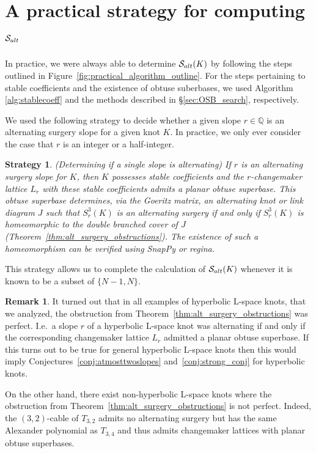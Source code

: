 \documentclass{amsart} %
\newcommand{\Q}{\mathbb{Q}}
\newcommand{\Salt}{\mathcal{S}_{\rm alt}}
\theoremstyle{thm}
\newtheorem{strat}[Theorem]{Strategy}
\theoremstyle{definition}
\newtheorem{rem}[Theorem]{Remark}
\numberwithin{equation}{section}
\begin{document}
\section{A practical strategy for computing \texorpdfstring{$\Salt$}{Salt}}
In practice, we were always able to determine $\Salt(K)$ by following the steps outlined in Figure~\ref{fig:practical_algorithm_outline}. For the steps pertaining to stable coefficients and the existence of obtuse suberbases, we used Algorithm \ref{alg:stablecoeff} and the methods described in \S\ref{sec:OSB_search}, respectively.

We used the following strategy to decide whether a given slope $r\in \Q$ is an alternating surgery slope for a given knot $K$. In practice, we only ever consider the case that $r$ is an integer or a half-integer. 

\begin{strat}\label{strat:single_alt}(Determining if a single slope is alternating)
    If $r$ is an alternating surgery slope for $K$, then $K$ possesses stable coefficients and the $r$-changemaker lattice $L_r$ with these stable coefficients admits a planar obtuse superbase. This obtuse superbase determines, via the Goeritz matrix, an alternating knot or link diagram $J$ such that $S_r^3(K)$ is an alternating surgery if and only if $S_r^3(K)$ is homeomorphic to the double branched cover of $J$ (Theorem~\ref{thm:alt_surgery_obstructions}). The existence of such a homeomorphism can be verified using SnapPy or regina. 
\end{strat}

This strategy allows us to complete the calculation of $\Salt(K)$ whenever it is known to be a subset of $\{N-1,N\}$.

\begin{rem}
    It turned out that in all examples of hyperbolic L-space knots, that we analyzed, the obstruction from Theorem~\ref{thm:alt_surgery_obstructions} was perfect. I.e.\ a slope $r$ of a hyperbolic L-space knot was alternating if and only if the corresponding changemaker lattice $L_r$ admitted a planar obtuse superbase. If this turns out to be true for general hyperbolic L-space knots then this would imply Conjectures~\ref{conj:atmosttwoslopes} and~\ref{conj:strong_conj} for hyperbolic knots. 
    
    On the other hand, there exist non-hyperbolic L-space knots where the obstruction from Theorem~\ref{thm:alt_surgery_obstructions} is not perfect. Indeed, the $(3,2)$-cable of $T_{3,2}$ admits no alternating surgery but has the same Alexander polynomial as $T_{3,4}$ and thus admits changemaker lattices with planar obtuse superbases. 
\end{rem}
\end{document}
